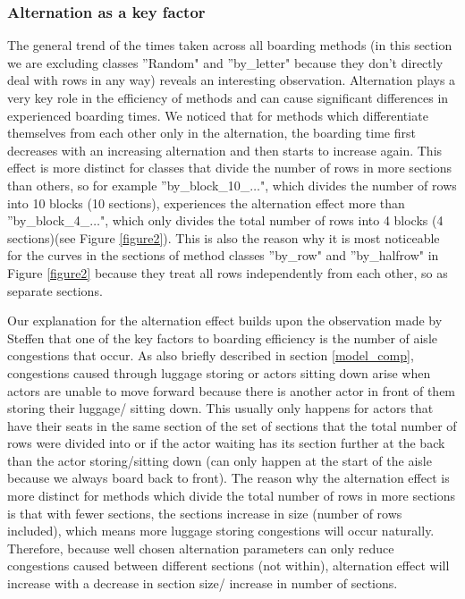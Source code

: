 \documentclass[11pt]{article}
\begin{document}
 
 \subsubsection{Alternation as a key factor}\label{alternation}
 The general trend of the times taken across all boarding methods (in this section we are excluding classes ''Random" and ''by\_letter" because they don't directly deal with rows in any way) reveals an interesting observation. Alternation plays a very key role in the efficiency of methods and can cause significant differences in experienced boarding times. We noticed that for methods which differentiate themselves from each other only in the alternation, the boarding time first decreases with an increasing alternation and then starts to increase again.
 This effect is more distinct for classes that divide the number of rows in more sections than others, so for example ''by\_block\_10\_$\dots$", which divides the number of rows into 10 blocks (10 sections), experiences the alternation effect more than ''by\_block\_4\_$\dots$", which only divides the total number of rows into 4 blocks (4 sections)(see Figure \ref{figure2}).  This is also the reason why it is most noticeable for the curves in the sections of method classes ''by\_row" and ''by\_halfrow" in Figure \ref{figure2} because they treat all rows independently from each other, so as separate sections. 
 
 
 Our explanation for the alternation effect builds upon the observation made by Steffen \cite{steffen} that one of the key factors to boarding efficiency is the number of aisle congestions that occur. As also briefly described in section \ref{model_comp}, congestions caused through luggage storing or actors sitting down arise when actors are unable to move forward because there is another actor in front of them storing their luggage/ sitting down. This usually only happens for actors that have their seats in the same section of the set of sections that the total number of rows were divided into or if the actor waiting has its section further at the back than the actor storing/sitting down (can only happen at the start of the aisle because we always board back to front). The reason why the alternation effect is more distinct for methods which divide the total number of rows in more sections is that with fewer sections, the sections increase in size (number of rows included), which means more luggage storing congestions will occur naturally. Therefore, because well chosen alternation parameters can only reduce congestions caused between different sections (not within), alternation effect will increase with a decrease in section size/ increase in number of sections.
 
\end{document}
